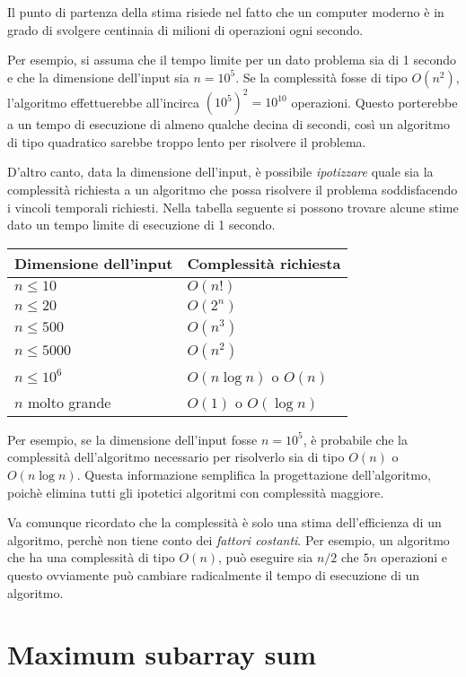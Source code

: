 Il punto di partenza della stima risiede nel fatto che 
un computer moderno è in grado di svolgere centinaia di 
milioni di operazioni ogni secondo.

Per esempio, si assuma che il tempo limite per un dato
problema sia di 1 secondo e che la dimensione dell'input sia $n=10^5$.
Se la complessità fosse di tipo $O(n^2)$,
l'algoritmo effettuerebbe all'incirca $(10^5)^2=10^{10}$ operazioni.
Questo porterebbe a un tempo di esecuzione di almeno qualche decina di secondi,
così un algoritmo di tipo quadratico sarebbe troppo lento per 
risolvere il problema.

D'altro canto, data la dimensione dell'input,
è possibile \emph{ipotizzare} quale sia la complessità
richiesta a un algoritmo che possa risolvere il problema
soddisfacendo i vincoli temporali richiesti.
Nella tabella seguente si possono trovare alcune stime 
dato un tempo limite di esecuzione di 1 secondo.

\begin{center}
\begin{tabular}{ll}
Dimensione dell'input & Complessità richiesta \\
\hline
$n \le 10$ & $O(n!)$ \\
$n \le 20$ & $O(2^n)$ \\
$n \le 500$ & $O(n^3)$ \\
$n \le 5000$ & $O(n^2)$ \\
$n \le 10^6$ & $O(n \log n)$ o $O(n)$ \\
$n$ molto grande & $O(1)$ o $O(\log n)$ \\
\end{tabular}
\end{center}

Per esempio, se la dimensione dell'input fosse $n=10^5$,
è probabile che la complessità dell'algoritmo necessario
per risolverlo sia di tipo $O(n)$ o $O(n \log n)$.
Questa informazione semplifica la progettazione dell'algoritmo,
poichè elimina tutti gli ipotetici algoritmi 
con complessità maggiore.


Va comunque ricordato che la complessità è solo una
stima dell'efficienza di un algoritmo,
perchè non tiene conto dei \emph{fattori costanti}.
Per esempio, un algoritmo che ha una complessità di tipo $O(n)$,
può eseguire sia $n/2$ che $5n$ operazioni e 
questo ovviamente può cambiare radicalmente il tempo
di esecuzione di un algoritmo.

\section{Maximum subarray sum}

